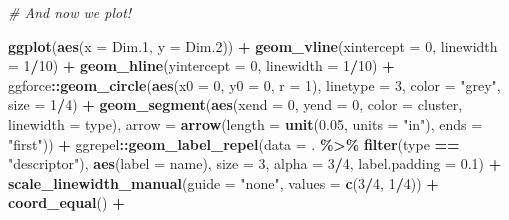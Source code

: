 \documentclass[
]{book}
\newenvironment{Shaded}{\begin{snugshade}}{\end{snugshade}}
\newcommand{\AttributeTok}[1]{\textcolor[rgb]{0.13,0.29,0.53}{#1}}
\newcommand{\CommentTok}[1]{\textcolor[rgb]{0.56,0.35,0.01}{\textit{#1}}}
\newcommand{\DecValTok}[1]{\textcolor[rgb]{0.00,0.00,0.81}{#1}}
\newcommand{\FloatTok}[1]{\textcolor[rgb]{0.00,0.00,0.81}{#1}}
\newcommand{\FunctionTok}[1]{\textcolor[rgb]{0.13,0.29,0.53}{\textbf{#1}}}
\newcommand{\NormalTok}[1]{#1}
\newcommand{\SpecialCharTok}[1]{\textcolor[rgb]{0.81,0.36,0.00}{\textbf{#1}}}
\newcommand{\StringTok}[1]{\textcolor[rgb]{0.31,0.60,0.02}{#1}}
\begin{document}
\begin{Shaded}
\begin{Highlighting}[]
\CommentTok{\# And now we plot!}
  
  \FunctionTok{ggplot}\NormalTok{(}\FunctionTok{aes}\NormalTok{(}\AttributeTok{x =}\NormalTok{ Dim}\FloatTok{.1}\NormalTok{, }\AttributeTok{y =}\NormalTok{ Dim}\FloatTok{.2}\NormalTok{)) }\SpecialCharTok{+} 
  \FunctionTok{geom\_vline}\NormalTok{(}\AttributeTok{xintercept =} \DecValTok{0}\NormalTok{, }\AttributeTok{linewidth =} \DecValTok{1}\SpecialCharTok{/}\DecValTok{10}\NormalTok{) }\SpecialCharTok{+} 
  \FunctionTok{geom\_hline}\NormalTok{(}\AttributeTok{yintercept =} \DecValTok{0}\NormalTok{, }\AttributeTok{linewidth =} \DecValTok{1}\SpecialCharTok{/}\DecValTok{10}\NormalTok{) }\SpecialCharTok{+} 
\NormalTok{  ggforce}\SpecialCharTok{::}\FunctionTok{geom\_circle}\NormalTok{(}\FunctionTok{aes}\NormalTok{(}\AttributeTok{x0 =} \DecValTok{0}\NormalTok{, }\AttributeTok{y0 =} \DecValTok{0}\NormalTok{, }\AttributeTok{r =} \DecValTok{1}\NormalTok{), }
                       \AttributeTok{linetype =} \DecValTok{3}\NormalTok{, }\AttributeTok{color =} \StringTok{"grey"}\NormalTok{, }\AttributeTok{size =} \DecValTok{1}\SpecialCharTok{/}\DecValTok{4}\NormalTok{) }\SpecialCharTok{+} 
  \FunctionTok{geom\_segment}\NormalTok{(}\FunctionTok{aes}\NormalTok{(}\AttributeTok{xend =} \DecValTok{0}\NormalTok{, }\AttributeTok{yend =} \DecValTok{0}\NormalTok{, }\AttributeTok{color =}\NormalTok{ cluster, }\AttributeTok{linewidth =}\NormalTok{ type),}
               \AttributeTok{arrow =} \FunctionTok{arrow}\NormalTok{(}\AttributeTok{length =} \FunctionTok{unit}\NormalTok{(}\FloatTok{0.05}\NormalTok{, }\AttributeTok{units =} \StringTok{"in"}\NormalTok{), }\AttributeTok{ends =} \StringTok{"first"}\NormalTok{)) }\SpecialCharTok{+}
\NormalTok{  ggrepel}\SpecialCharTok{::}\FunctionTok{geom\_label\_repel}\NormalTok{(}\AttributeTok{data =}\NormalTok{ . }\SpecialCharTok{\%\textgreater{}\%} \FunctionTok{filter}\NormalTok{(type }\SpecialCharTok{==} \StringTok{"descriptor"}\NormalTok{),}
                           \FunctionTok{aes}\NormalTok{(}\AttributeTok{label =}\NormalTok{ name),}
                           \AttributeTok{size =} \DecValTok{3}\NormalTok{, }\AttributeTok{alpha =} \DecValTok{3}\SpecialCharTok{/}\DecValTok{4}\NormalTok{, }\AttributeTok{label.padding =} \FloatTok{0.1}\NormalTok{) }\SpecialCharTok{+} 
  \FunctionTok{scale\_linewidth\_manual}\NormalTok{(}\AttributeTok{guide =} \StringTok{"none"}\NormalTok{, }\AttributeTok{values =} \FunctionTok{c}\NormalTok{(}\DecValTok{3}\SpecialCharTok{/}\DecValTok{4}\NormalTok{, }\DecValTok{1}\SpecialCharTok{/}\DecValTok{4}\NormalTok{)) }\SpecialCharTok{+} 
  \FunctionTok{coord\_equal}\NormalTok{() }\SpecialCharTok{+} 

\end{Highlighting}
\end{Shaded}
\end{document}
